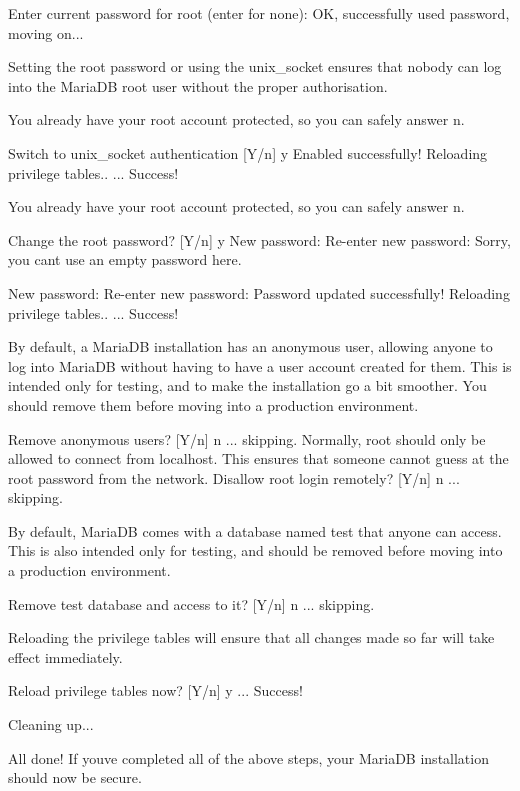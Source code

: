 Enter current password for root (enter for none)\+: OK, successfully used password, moving on...

Setting the root password or using the unix\+\_\+socket ensures that nobody can log into the Maria\+DB root user without the proper authorisation.

You already have your root account protected, so you can safely answer \textquotesingle{}n\textquotesingle{}.

Switch to unix\+\_\+socket authentication \mbox{[}Y/n\mbox{]} y Enabled successfully! Reloading privilege tables.. ... Success!

You already have your root account protected, so you can safely answer \textquotesingle{}n\textquotesingle{}.

Change the root password? \mbox{[}Y/n\mbox{]} y New password\+: Re-\/enter new password\+: Sorry, you can\textquotesingle{}t use an empty password here.

New password\+: Re-\/enter new password\+: Password updated successfully! Reloading privilege tables.. ... Success!

By default, a Maria\+DB installation has an anonymous user, allowing anyone to log into Maria\+DB without having to have a user account created for them. This is intended only for testing, and to make the installation go a bit smoother. You should remove them before moving into a production environment.

Remove anonymous users? \mbox{[}Y/n\mbox{]} n ... skipping. Normally, root should only be allowed to connect from \textquotesingle{}localhost\textquotesingle{}. This ensures that someone cannot guess at the root password from the network. Disallow root login remotely? \mbox{[}Y/n\mbox{]} n ... skipping.

By default, Maria\+DB comes with a database named \textquotesingle{}test\textquotesingle{} that anyone can access. This is also intended only for testing, and should be removed before moving into a production environment.

Remove test database and access to it? \mbox{[}Y/n\mbox{]} n ... skipping.

Reloading the privilege tables will ensure that all changes made so far will take effect immediately.

Reload privilege tables now? \mbox{[}Y/n\mbox{]} y ... Success!

Cleaning up...

All done! If you\textquotesingle{}ve completed all of the above steps, your Maria\+DB installation should now be secure.

